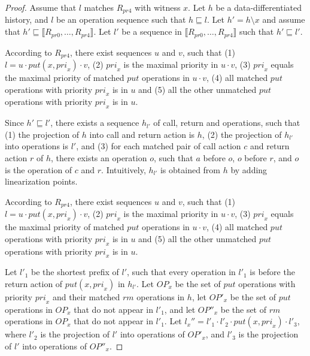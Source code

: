\begin {proof}

Assume that $l$ matches $R_{\textit{pr4}}$ with witness $x$. Let $h$ be a data-differentiated history, and $l$ be an operation sequence such that $h \sqsubseteq l$. Let $h'=h \setminus x$ and assume that $h' \sqsubseteq \llbracket R_{\textit{pr0}},\ldots,R_{\textit{pr4}} \rrbracket$. Let $l'$ be a sequence in $\llbracket R_{\textit{pr0}},\ldots,R_{\textit{pr4}} \rrbracket$ such that $h' \sqsubseteq l'$.

According to $R_{\textit{pr4}}$, there exist sequences $u$ and $v$, such that (1) $l=u \cdot \textit{put}(x,\textit{pri}_x) \cdot v$, (2) $\textit{pri}_x$ is the maximal priority in $u \cdot v$, (3) $\textit{pri}_x$ equals the maximal priority of matched $\textit{put}$ operations in $u \cdot v$, (4) all matched $\textit{put}$ operations with priority $\textit{pri}_x$ is in $u$ and (5) all the other unmatched $\textit{put}$ operations with priority $\textit{pri}_x$ is in $u$.

Since $h' \sqsubseteq l'$, there exists a sequence $h_{l'}$ of call, return and operations, such that (1) the projection of $h$ into call and return action is $h$, (2) the projection of $h_{l'}$ into operations is $l'$, and (3) for each matched pair of call action $c$ and return action $r$ of $h$, there exists an operation $o$, such that $a$ before $o$, $o$ before $r$, and $o$ is the operation of $c$ and $r$. Intuitively, $h_{l'}$ is obtained from $h$ by adding linearization points.

According to $R_{\textit{pr4}}$, there exist sequences $u$ and $v$, such that (1) $l=u \cdot \textit{put}(x,\textit{pri}_x) \cdot v$, (2) $\textit{pri}_x$ is the maximal priority in $u \cdot v$, (3) $\textit{pri}_x$ equals the maximal priority of matched $\textit{put}$ operations in $u \cdot v$, (4) all matched $\textit{put}$ operations with priority $\textit{pri}_x$ is in $u$ and (5) all the other unmatched $\textit{put}$ operations with priority $\textit{pri}_x$ is in $u$.

Let $l'_1$ be the shortest prefix of $l'$, such that every operation in $l'_1$ is before the return action of $\textit{put}(x,\textit{pri}_x)$ in $h_{l'}$. Let $\textit{OP}_x$ be the set of $\textit{put}$ operations with priority $\textit{pri}_x$ and their matched $\textit{rm}$ operations in $h$, let $\textit{OP}'_x$ be the set of $\textit{put}$ operations in $\textit{OP}_x$ that do not appear in $l'_1$, and let $\textit{OP}''_x$ be the set of $\textit{rm}$ operations in $\textit{OP}_x$ that do not appear in $l'_1$. Let $l_x''=l'_1 \cdot l'_2 \cdot \textit{put}(x,\textit{pri}_x) \cdot l'_3$, where $l'_2$ is the projection of $l'$ into operations of $\textit{OP}'_x$, and $l'_3$ is the projection of $l'$ into operations of $\textit{OP}''_x$.


\end{proof}
